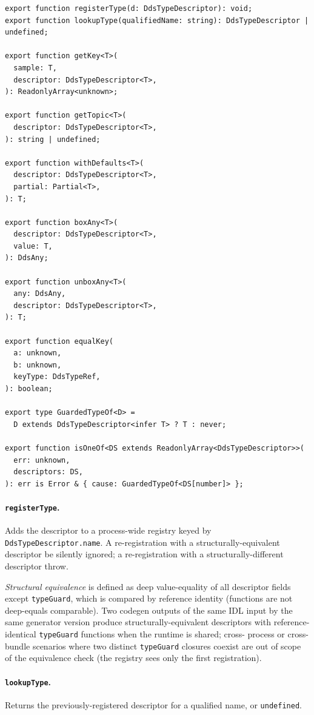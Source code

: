 \documentclass{../styles/zerodds-vendor-spec}
\begin{document}
\begin{lstlisting}
export function registerType(d: DdsTypeDescriptor): void;
export function lookupType(qualifiedName: string): DdsTypeDescriptor | undefined;

export function getKey<T>(
  sample: T,
  descriptor: DdsTypeDescriptor<T>,
): ReadonlyArray<unknown>;

export function getTopic<T>(
  descriptor: DdsTypeDescriptor<T>,
): string | undefined;

export function withDefaults<T>(
  descriptor: DdsTypeDescriptor<T>,
  partial: Partial<T>,
): T;

export function boxAny<T>(
  descriptor: DdsTypeDescriptor<T>,
  value: T,
): DdsAny;

export function unboxAny<T>(
  any: DdsAny,
  descriptor: DdsTypeDescriptor<T>,
): T;

export function equalKey(
  a: unknown,
  b: unknown,
  keyType: DdsTypeRef,
): boolean;

export type GuardedTypeOf<D> =
  D extends DdsTypeDescriptor<infer T> ? T : never;

export function isOneOf<DS extends ReadonlyArray<DdsTypeDescriptor>>(
  err: unknown,
  descriptors: DS,
): err is Error & { cause: GuardedTypeOf<DS[number]> };
\end{lstlisting}

\paragraph{\texttt{registerType}.} Adds the descriptor to a
process-wide registry keyed by \texttt{DdsTypeDescriptor.name}.
A re-registration with a structurally-equivalent descriptor
 be silently ignored; a re-registration with a
structurally-different descriptor  throw.

\emph{Structural equivalence} is defined as deep value-equality
of all descriptor fields except \texttt{typeGuard}, which is
compared by reference identity (functions are not deep-equals
comparable). Two codegen outputs of the same IDL input by the
same generator version  produce
structurally-equivalent descriptors with reference-identical
\texttt{typeGuard} functions when the runtime is shared; cross-
process or cross-bundle scenarios where two distinct
\texttt{typeGuard} closures coexist are out of scope of the
equivalence check (the registry sees only the first
registration).

\paragraph{\texttt{lookupType}.} Returns the previously-registered
descriptor for a qualified name, or \texttt{undefined}.
\end{document}

